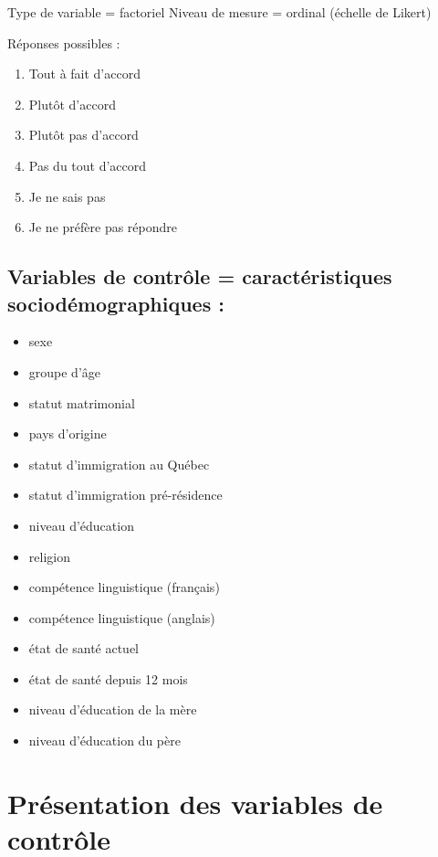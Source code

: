\documentclass[
]{article}
\providecommand{\tightlist}{%
  \setlength{\itemsep}{0pt}\setlength{\parskip}{0pt}}
\begin{document}
Type de variable = factoriel Niveau de mesure = ordinal (échelle de
Likert)

Réponses possibles :

\begin{enumerate}
\def\labelenumi{\arabic{enumi}.}
\tightlist
\item
  Tout à fait d'accord
\item
  Plutôt d'accord
\item
  Plutôt pas d'accord
\item
  Pas du tout d'accord
\item
  Je ne sais pas
\item
  Je ne préfère pas répondre
\end{enumerate}

\hypertarget{variables-de-contruxf4le-caractuxe9ristiques-socioduxe9mographiques}{%
\subsection{Variables de contrôle = caractéristiques sociodémographiques
:}\label{variables-de-contruxf4le-caractuxe9ristiques-socioduxe9mographiques}}

\begin{itemize}
\tightlist
\item
  sexe
\item
  groupe d'âge
\item
  statut matrimonial
\item
  pays d'origine
\item
  statut d'immigration au Québec
\item
  statut d'immigration pré-résidence
\item
  niveau d'éducation
\item
  religion
\item
  compétence linguistique (français)
\item
  compétence linguistique (anglais)
\item
  état de santé actuel
\item
  état de santé depuis 12 mois
\item
  niveau d'éducation de la mère
\item
  niveau d'éducation du père
\end{itemize}

\hypertarget{pruxe9sentation-des-variables-de-contruxf4le}{%
\section{Présentation des variables de
contrôle}\label{pruxe9sentation-des-variables-de-contruxf4le}}
\end{document}
